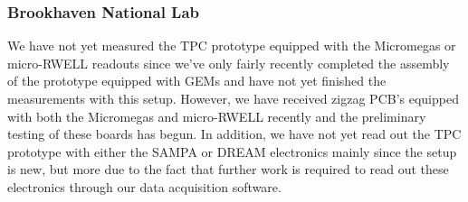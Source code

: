 \subsubsection{Brookhaven National Lab} 
We have not yet measured the TPC prototype equipped with the Micromegas or micro-RWELL readouts since we've only fairly recently completed the assembly of the prototype equipped with GEMs and have not yet finished the measurements with this setup. However, we have received zigzag PCB's equipped with both the Micromegas and micro-RWELL recently and the preliminary testing of these boards has begun. In addition, we have not yet read out the TPC prototype with either the SAMPA or DREAM electronics mainly since the setup is new, but more due to the fact that further work is required to read out these electronics through our data acquisition software.      